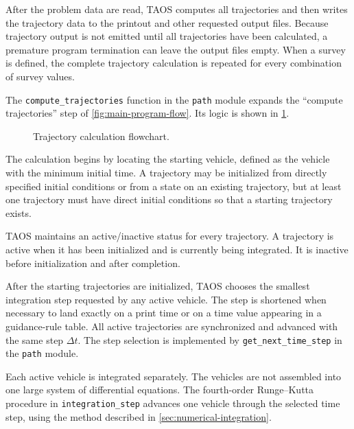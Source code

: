 After the problem data are read, TAOS computes all trajectories and then writes the
trajectory data to the printout and other requested output files. Because trajectory
output is not emitted until all trajectories have been calculated, a premature program
termination can leave the output files empty. When a survey is defined, the complete
trajectory calculation is repeated for every combination of survey values.


The \texttt{compute\_trajectories} function in the \texttt{path} module expands the
``compute trajectories'' step of \cref{fig:main-program-flow}. Its logic is shown in
\cref{fig:trajectory-calculation-flow}.

\begin{figure}[htbp]
  \centering
  
  \caption{Trajectory calculation flowchart.}
  \label{fig:trajectory-calculation-flow}
\end{figure}

The calculation begins by locating the starting vehicle, defined as the vehicle with
the minimum initial time. A trajectory may be initialized from directly specified
initial conditions or from a state on an existing trajectory, but at least one trajectory
must have direct initial conditions so that a starting trajectory exists.

TAOS maintains an active/inactive status for every trajectory. A trajectory is active
when it has been initialized and is currently being integrated. It is inactive before
initialization and after completion.

After the starting trajectories are initialized, TAOS chooses the smallest integration
step requested by any active vehicle. The step is shortened when necessary to land
exactly on a print time or on a time value appearing in a guidance-rule table. All
active trajectories are synchronized and advanced with the same step
$\Delta t$. The step selection is implemented by
\texttt{get\_next\_time\_step} in the \texttt{path} module.

Each active vehicle is integrated separately. The vehicles are not assembled into one
large system of differential equations. The fourth-order Runge--Kutta procedure in
\texttt{integration\_step} advances one vehicle through the selected time step, using
the method described in \cref{sec:numerical-integration}.


